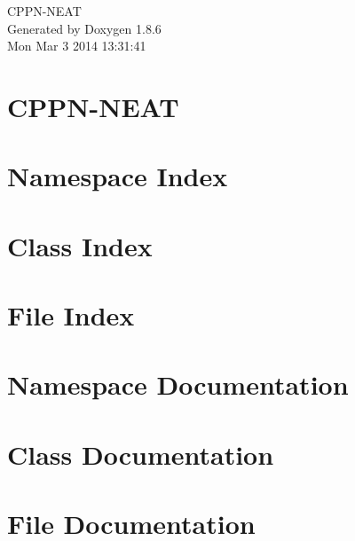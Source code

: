 \documentclass[twoside]{book}
\newcommand{\clearemptydoublepage}{%
  \newpage{\pagestyle{empty}\cleardoublepage}%
}
\begin{document}
\hypersetup{pageanchor=false}
\begin{titlepage}
\vspace*{7cm}
\begin{center}%
{\Large C\-P\-P\-N-\/\-N\-E\-A\-T }\\
\vspace*{1cm}
{\large Generated by Doxygen 1.8.6}\\
\vspace*{0.5cm}
{\small Mon Mar 3 2014 13:31:41}\\
\end{center}
\end{titlepage}
\clearemptydoublepage
\tableofcontents
\clearemptydoublepage
{}
\hypersetup{pageanchor=true}

\chapter{C\-P\-P\-N-\/\-N\-E\-A\-T}
\label{md__r_e_a_d_m_e}
\hypertarget{md__r_e_a_d_m_e}{}

\chapter{Namespace Index}

\chapter{Class Index}

\chapter{File Index}

\chapter{Namespace Documentation}

\chapter{Class Documentation}






\chapter{File Documentation}













\newpage
{}
{}
\printindex
\end{document}
